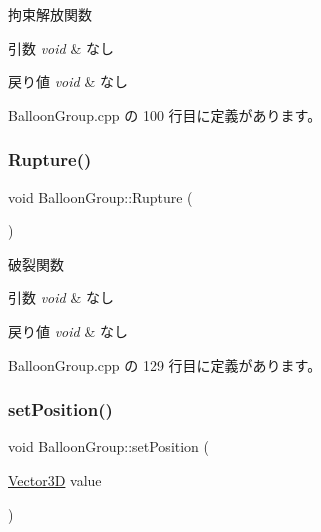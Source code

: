 拘束解放関数 


\begin{DoxyParams}{引数}
{\em void} & なし \\
\hline
\end{DoxyParams}

\begin{DoxyRetVals}{戻り値}
{\em void} & なし \\
\hline
\end{DoxyRetVals}


 Balloon\+Group.\+cpp の 100 行目に定義があります。

\mbox{\label{class_balloon_group_a6c7ee1166595e8809a06ccfeb49b8371}} 
\subsubsection{\texorpdfstring{Rupture()}{Rupture()}}
{\footnotesize\ttfamily void Balloon\+Group\+::\+Rupture (\begin{DoxyParamCaption}{ }\end{DoxyParamCaption})}



破裂関数 


\begin{DoxyParams}{引数}
{\em void} & なし \\
\hline
\end{DoxyParams}

\begin{DoxyRetVals}{戻り値}
{\em void} & なし \\
\hline
\end{DoxyRetVals}


 Balloon\+Group.\+cpp の 129 行目に定義があります。

\mbox{\label{class_balloon_group_a6f62d77c2467b0b54f311daca117a0aa}} 
\subsubsection{\texorpdfstring{set\+Position()}{setPosition()}}
{\footnotesize\ttfamily void Balloon\+Group\+::set\+Position (\begin{DoxyParamCaption}\item[{\mbox{\hyperlink{class_vector3_d}{Vector3D}}}]{value }\end{DoxyParamCaption})}



